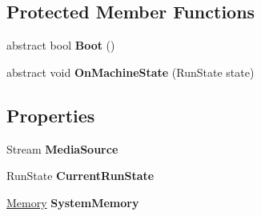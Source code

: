 \subsection*{Protected Member Functions}
\begin{DoxyCompactItemize}
\item 
\hypertarget{class_eimu_1_1_core_1_1_virtual_machine_a780567d0a55d56c2ea7025968a13c20a}{
abstract bool {\bfseries Boot} ()}
\label{class_eimu_1_1_core_1_1_virtual_machine_a780567d0a55d56c2ea7025968a13c20a}

\item 
\hypertarget{class_eimu_1_1_core_1_1_virtual_machine_ac855d82ef2d7e10e52b1a2e8322681fb}{
abstract void {\bfseries OnMachineState} (RunState state)}
\label{class_eimu_1_1_core_1_1_virtual_machine_ac855d82ef2d7e10e52b1a2e8322681fb}

\end{DoxyCompactItemize}
\subsection*{Properties}
\begin{DoxyCompactItemize}
\item 
\hypertarget{class_eimu_1_1_core_1_1_virtual_machine_a842c7ab4c392c703c2a2858040413dfd}{
Stream {\bfseries MediaSource}}
\label{class_eimu_1_1_core_1_1_virtual_machine_a842c7ab4c392c703c2a2858040413dfd}

\item 
\hypertarget{class_eimu_1_1_core_1_1_virtual_machine_a2e950e6c143348b09c15be92a10e5d58}{
RunState {\bfseries CurrentRunState}}
\label{class_eimu_1_1_core_1_1_virtual_machine_a2e950e6c143348b09c15be92a10e5d58}

\item 
\hypertarget{class_eimu_1_1_core_1_1_virtual_machine_a0da848d0904240d1457cb5b61fab7642}{
\hyperlink{class_eimu_1_1_core_1_1_memory}{Memory} {\bfseries SystemMemory}}
\label{class_eimu_1_1_core_1_1_virtual_machine_a0da848d0904240d1457cb5b61fab7642}

\end{DoxyCompactItemize}
